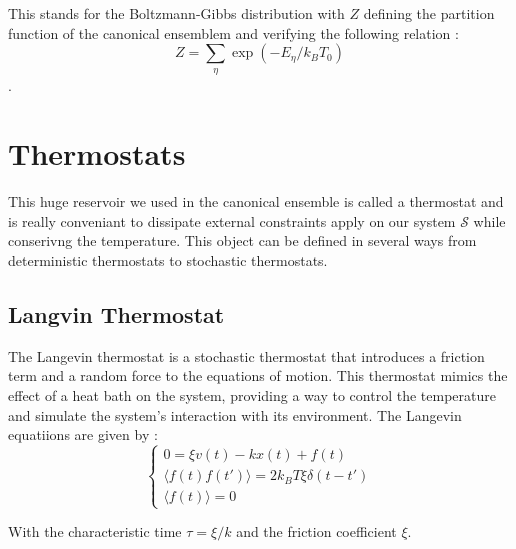\documentclass[ansiapaper]{report}
\begin{document}
\begin{multicols}{3}
This stands for the Boltzmann-Gibbs distribution with $Z$ defining the partition function of the canonical ensemblem and verifying the following relation : $$ Z = \sum_\eta \exp(-E_\eta / k_B T_0) $$. 
\section{Thermostats}
This huge reservoir we used in the canonical ensemble is called a thermostat and is really conveniant to dissipate external constraints apply on our system $\mathcal{S}$ while conserivng the temperature. This object can be defined in several ways from deterministic thermostats to stochastic thermostats. 
\subsection{Langvin Thermostat}
The Langevin thermostat is a stochastic thermostat that introduces a friction term and a random force to the equations of motion. This thermostat mimics the effect of a heat bath on the system, providing a way to control the temperature and simulate the system's interaction with its environment. The Langevin equatiions are given by : 
$$ 
\begin{cases} 
0 = \xi v(t) - kx(t) + f(t)\\
\langle f(t)f(t')\rangle = 2k_B T \xi \delta(t - t')\\
\langle f(t)\rangle = 0
\end{cases} 
$$

With the characteristic time $\tau = \xi/k$ and the friction coefficient $\xi$.

\end{multicols}    
\end{document}
